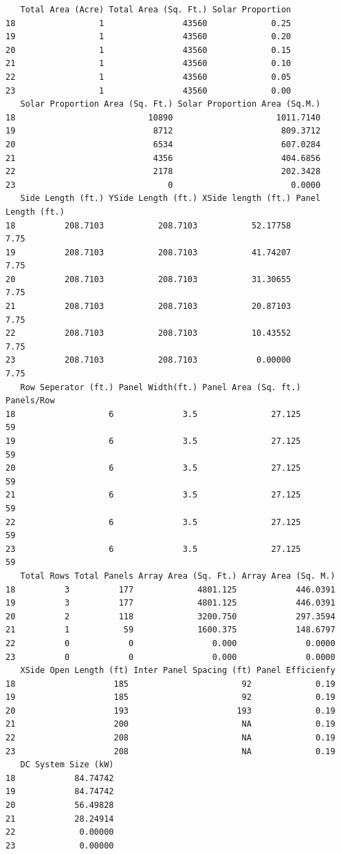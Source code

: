 \documentclass[
  letterpaper,
  DIV=11,
  numbers=noendperiod]{scrartcl}
\begin{document}
\begin{verbatim}
   Total Area (Acre) Total Area (Sq. Ft.) Solar Proportion
18                 1                43560             0.25
19                 1                43560             0.20
20                 1                43560             0.15
21                 1                43560             0.10
22                 1                43560             0.05
23                 1                43560             0.00
   Solar Proportion Area (Sq. Ft.) Solar Proportion Area (Sq.M.)
18                           10890                     1011.7140
19                            8712                      809.3712
20                            6534                      607.0284
21                            4356                      404.6856
22                            2178                      202.3428
23                               0                        0.0000
   Side Length (ft.) YSide Length (ft.) XSide length (ft.) Panel Length (ft.)
18          208.7103           208.7103           52.17758               7.75
19          208.7103           208.7103           41.74207               7.75
20          208.7103           208.7103           31.30655               7.75
21          208.7103           208.7103           20.87103               7.75
22          208.7103           208.7103           10.43552               7.75
23          208.7103           208.7103            0.00000               7.75
   Row Seperator (ft.) Panel Width(ft.) Panel Area (Sq. ft.) Panels/Row
18                   6              3.5               27.125         59
19                   6              3.5               27.125         59
20                   6              3.5               27.125         59
21                   6              3.5               27.125         59
22                   6              3.5               27.125         59
23                   6              3.5               27.125         59
   Total Rows Total Panels Array Area (Sq. Ft.) Array Area (Sq. M.)
18          3          177             4801.125            446.0391
19          3          177             4801.125            446.0391
20          2          118             3200.750            297.3594
21          1           59             1600.375            148.6797
22          0            0                0.000              0.0000
23          0            0                0.000              0.0000
   XSide Open Length (ft) Inter Panel Spacing (ft) Panel Efficienfy
18                    185                       92             0.19
19                    185                       92             0.19
20                    193                      193             0.19
21                    200                       NA             0.19
22                    208                       NA             0.19
23                    208                       NA             0.19
   DC System Size (kW)
18            84.74742
19            84.74742
20            56.49828
21            28.24914
22             0.00000
23             0.00000
\end{verbatim}
\end{document}
